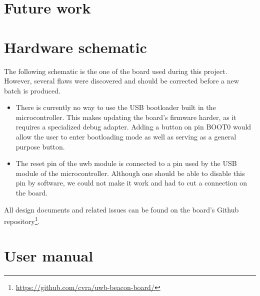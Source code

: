 \documentclass[a4paper, 12pt]{scrreprt}
\begin{document}
\chapter{Future work}
\appendix
\chapter{Hardware schematic}

The following schematic is the one of the board used during this project.
However, several flaws were discovered and should be corrected before a new batch is produced.

\begin{itemize}
    \item There is currently no way to use the USB bootloader built in the microcontroller.
        This makes updating the board's firmware harder, as it requires a specialized debug adapter.
        Adding a button on pin BOOT0 would allow the user to enter bootloading mode as well as serving as a general purpose button.
    \item The reset pin of the \gls{uwb} module is connected to a pin used by the USB module of the microcontroller.
        Although one should be able to disable this pin by software, we could not make it work and had to cut a connection on the board.
\end{itemize}

All design documents and related issues can be found on the board's Github repository\footnote{\url{https://github.com/cvra/uwb-beacon-board/}}.




\chapter{User manual}


\clearpage
\nocite{*} %


\end{document}
